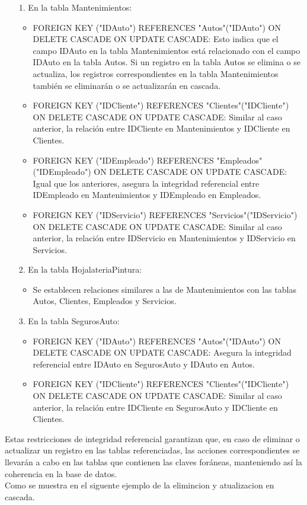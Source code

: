 \documentclass[12pt]{article}
\begin{document}
    \begin{itemize}
        \item[1.] En la tabla Mantenimientos:
        \begin{itemize}
            \item FOREIGN KEY ("IDAuto") REFERENCES "Autos"("IDAuto") ON DELETE CASCADE ON UPDATE CASCADE: Esto indica que el campo IDAuto en la tabla Mantenimientos está relacionado con el campo IDAuto en la tabla Autos. Si un registro en la tabla Autos se elimina o se actualiza, los registros correspondientes en la tabla Mantenimientos también se eliminarán o se actualizarán en cascada.
            \item FOREIGN KEY ("IDCliente") REFERENCES "Clientes"("IDCliente") ON DELETE CASCADE ON UPDATE CASCADE: Similar al caso anterior, la relación entre IDCliente en Mantenimientos y IDCliente en Clientes.
            \item FOREIGN KEY ("IDEmpleado") REFERENCES "Empleados"("IDEmpleado") ON DELETE CASCADE ON UPDATE CASCADE: Igual que los anteriores, asegura la integridad referencial entre IDEmpleado en Mantenimientos y IDEmpleado  en Empleados.
            \item FOREIGN KEY ("IDServicio") REFERENCES "Servicios"("IDServicio") ON DELETE CASCADE ON UPDATE CASCADE:  Similar al caso anterior, la relación entre IDServicio en Mantenimientos y IDServicio en Servicios.
        \end{itemize}
        \item[2.] En la tabla HojalateriaPintura:
        \begin{itemize}
            \item Se establecen relaciones similares a las de Mantenimientos con las tablas Autos, Clientes, Empleados y Servicios.
        \end{itemize}
        \item[3.] En la tabla SegurosAuto:
        \begin{itemize}
            \item FOREIGN KEY ("IDAuto") REFERENCES "Autos"("IDAuto") ON DELETE CASCADE ON UPDATE CASCADE: Asegura la integridad referencial entre IDAuto en SegurosAuto y IDAuto en Autos.
            \item FOREIGN KEY ("IDCliente") REFERENCES "Clientes"("IDCliente") ON DELETE CASCADE ON UPDATE CASCADE: Similar al caso anterior, la relación entre IDCliente en SegurosAuto y IDCliente en Clientes.
        \end{itemize}
    \end{itemize}
    Estas restricciones de integridad referencial garantizan que, en caso de eliminar o actualizar un registro en las tablas referenciadas, las acciones correspondientes se llevarán a cabo en las tablas que contienen las claves foráneas, manteniendo así la coherencia en la base de datos.\\
    Como se muestra en el siguente ejemplo de la elimincion y atualizacion en cascada.\\
\end{document}
